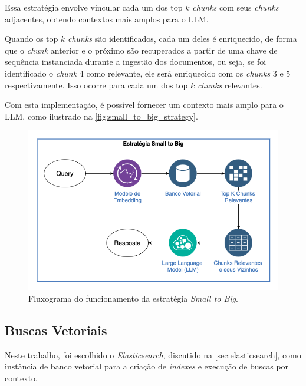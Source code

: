 \documentclass[a4paper, 12pt]{article}
\begin{document}
    Essa estratégia envolve vincular cada um dos top $k$ \textit{chunks} com seus \textit{chunks} adjacentes, obtendo contextos mais amplos para o LLM. 
    
    Quando os top $k$ \textit{chunks} são identificados, cada um deles é enriquecido, de forma que o \textit{chunk} anterior e o próximo são recuperados a partir de uma chave de sequência instanciada durante a ingestão dos documentos, ou seja, se foi identificado o \textit{chunk} $4$ como relevante, ele será enriquecido com os \textit{chunks} $3$ e $5$ respectivamente. Isso ocorre para cada um dos top $k$ \textit{chunks} relevantes.
    
    Com esta implementação, é possível fornecer um contexto mais amplo para o LLM, como ilustrado na \autoref{fig:small_to_big_strategy}.
    
    \begin{figure}[ht]
        \includegraphics[width=\textwidth,height=0.9\textheight,keepaspectratio]{small-to-big-strategy.png}
        \centering
        \caption{Fluxograma do funcionamento da estratégia \textit{Small to Big}.}
        \centering
        \label{fig:small_to_big_strategy}
    \end{figure}

    

    \subsection{Buscas Vetoriais} \label{sec:vec_search}

    Neste trabalho, foi escolhido o \textit{Elasticsearch}, discutido na \autoref{sec:elasticsearch}, como instância de banco vetorial para a criação de \textit{indexes} e execução de buscas por contexto.
\end{document}
